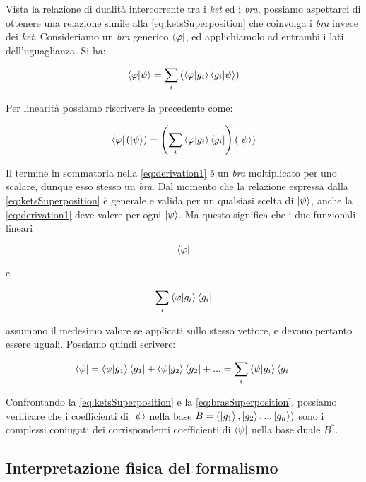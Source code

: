 Vista la relazione di dualità intercorrente tra i \textit{ket} ed i \textit{bra}, possiamo aspettarci di ottenere una relazione simile alla \eqref{eq:ketsSuperposition} che coinvolga i \textit{bra} invece dei \textit{ket}. Consideriamo un \textit{bra} generico $\bra{\varphi}$, ed applichiamolo ad entrambi i lati dell'uguaglianza. Si ha:

	\begin{equation}
		\braket{\varphi}{\psi} = \sum_i \left( \braket{\varphi}{g_i} \braket{g_i}{\psi} \right)
	\end{equation}

Per linearità possiamo riscrivere la precedente come:

	\begin{equation} \label{eq:derivation1}
		\bra{\varphi}(\ket{\psi}) = \left( \sum_i \braket{\varphi}{g_i} \bra{g_i} \right) (\ket{\psi})
	\end{equation}

Il termine in sommatoria nella \eqref{eq:derivation1} è un \textit{bra} moltiplicato per uno scalare, dunque esso stesso un \textit{bra}. Dal momento che la relazione espressa dalla \eqref{eq:ketsSuperposition} è generale e valida per un qualsiasi scelta di $\ket{\psi}$, anche la \eqref{eq:derivation1} deve valere per ogni $\ket{\psi}$. Ma questo significa che i due funzionali lineari

	\[
		\bra{\varphi}
	\]

e

	\[
		\sum_i \braket{\varphi}{g_i} \bra{g_i}
	\]


assumono il medesimo valore se applicati sullo stesso vettore, e devono pertanto essere uguali. Possiamo quindi scrivere:

	\begin{equation} \label{eq:brasSuperposition}
		\bra{\psi} = \braket{\psi}{g_1} \bra{g_1} + \braket{\psi}{g_2} \bra{g_2} + ... = \sum_i \braket{\psi}{g_i} \bra{g_i}
	\end{equation}

Confrontando la \eqref{eq:ketsSuperposition} e la \eqref{eq:brasSuperposition}, possiamo verificare che i coefficienti di $\ket{\psi}$ nella base $B = (\ket{g_1}, \ket{g_2},... \ket{g_n})$ sono i complessi coniugati dei corrispondenti coefficienti di $\bra{\psi}$ nella base duale $B^*$.

\subsection{Interpretazione fisica del formalismo}

